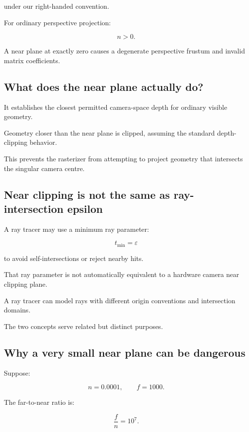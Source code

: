 under our right-handed convention.

For ordinary perspective projection:

\[
 \boxed{n>0}.
\]

A near plane at exactly zero causes a degenerate perspective frustum and invalid matrix coefficients.

\subsection{What does the near plane actually do?}\label{02-foundations-ii-ch033-what-does-the-near-plane-actually-do}

It establishes the closest permitted camera-space depth for ordinary visible geometry.

Geometry closer than the near plane is clipped, assuming the standard depth-clipping behavior.

This prevents the rasterizer from attempting to project geometry that intersects the singular camera centre.

\subsection{Near clipping is not the same as ray-intersection epsilon}\label{02-foundations-ii-ch033-near-clipping-is-not-the-same-as-ray-intersection-epsilon}

A ray tracer may use a minimum ray parameter:

\[
 t_{\min}=\varepsilon
\]

to avoid self-intersections or reject nearby hits.

That ray parameter is not automatically equivalent to a hardware camera near clipping plane.

A ray tracer can model rays with different origin conventions and intersection domains.

The two concepts serve related but distinct purposes.

\subsection{Why a very small near plane can be dangerous}\label{02-foundations-ii-ch033-why-a-very-small-near-plane-can-be-dangerous}

Suppose:

\[
 n=0.0001, \qquad f=1000.
\]

The far-to-near ratio is:

\[
 \frac fn=10^7.
\]

